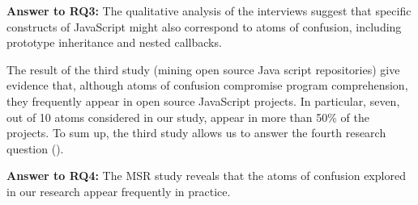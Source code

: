 \begin{mh}
  {\bf Answer to RQ3:} The qualitative analysis of the
  interviews suggest that specific constructs of
  JavaScript might also correspond to atoms of
  confusion, including prototype inheritance and
  nested callbacks. 
\end{mh}

The result of the third study (mining open source
Java script repositories) give evidence that,
although atoms of confusion compromise program
comprehension, they frequently appear in open
source JavaScript projects. In particular,
seven, out of 10 atoms considered
  in our study, appear in more than 50\% of
the projects. To sum up, the third study
allows us to answer the fourth research
question (\emph{\rqd}).


\begin{mh}
  {\bf Answer to RQ4:} The MSR study reveals that
  the atoms of confusion explored in our research
  appear frequently in practice. 
\end{mh}






